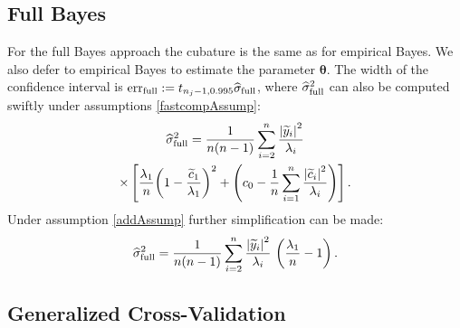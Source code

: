 \documentclass[twocolumn]{svjour3}          %
\newcommand{\bm}[1]{\boldsymbol{#1}}
\newcommand{\vtheta}{{\bm{\theta}}}
\newcommand{\hsigma}{\widehat{\sigma}}
\newcommand{\err}{\textup{err}}
\def\abs#1{\ensuremath{\left \lvert #1 \right \rvert}}
\begin{document}
\subsection{Full Bayes}
For the full Bayes approach the cubature is the same as for empirical Bayes.  We also defer to empirical Bayes to estimate the parameter $\vtheta$.  The width of the confidence interval is $\err_{\textup{full}} 
:= t_{n_j-1,0.995} \hsigma_{\textup{full}}$, where $\hsigma_{\textup{full}}^2$ can also be computed swiftly under assumptions \eqref{fastcompAssump}:
\begin{multline*} %
\widehat{\sigma}^2_{\textup{full}}
=
\frac{1}{n(n-1)} \sum_{i=2}^n \frac{\abs{\widetilde{y}_i}^2}{\lambda_i}
\\
\times
\left[\frac{\lambda_1}{n}{\left(1 - \frac{\widetilde{c}_1}{\lambda_1}\right)^2} + \left(c_0  - \frac 1n \sum_{i=1}^n \frac{\abs{\widetilde{c}_i}^2}{\lambda_i}\right) \right] .
\end{multline*}
Under assumption \eqref{addAssump} further simplification can be made:
\begin{equation} \label{FJH:eq:signmaFullSimple}
\widehat{\sigma}^2_{\textup{full}}
=
\frac{1}{n(n-1)} \sum_{i=2}^n \frac{\abs{\widetilde{y}_i}^2}{\lambda_i} \, \left(\frac{\lambda_1}{n}  - 1  \right).
\end{equation}



\subsection{Generalized Cross-Validation}
\end{document}
